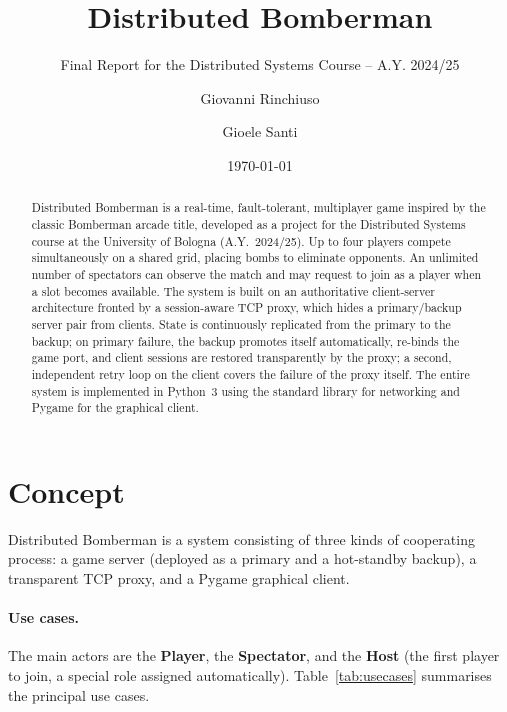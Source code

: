 \documentclass{scrartcl}
\title{\LARGE Distributed Bomberman}
\subtitle{Final Report for the Distributed Systems Course -- A.Y. 2024/25}
\author{
    Giovanni Rinchiuso \\ \emailaddr{giovanni.rinchiuso@studio.unibo.it}
    \and
    Gioele Santi \\ \emailaddr{gioele.santi2@studio.unibo.it}
}
\date{\today}
\begin{document}
\maketitle

\begin{abstract}
Distributed Bomberman is a real-time, fault-tolerant, multiplayer game inspired by the classic Bomberman arcade title, developed as a project for the Distributed Systems course at the University of Bologna (A.Y.\ 2024/25). Up to four players compete simultaneously on a shared grid, placing bombs to eliminate opponents. An unlimited number of spectators can observe the match and may request to join as a player when a slot becomes available. The system is built on an authoritative client-server architecture fronted by a session-aware TCP proxy, which hides a primary/backup server pair from clients. State is continuously replicated from the primary to the backup; on primary failure, the backup promotes itself automatically, re-binds the game port, and client sessions are restored transparently by the proxy; a second, independent retry loop on the client covers the failure of the proxy itself. The entire system is implemented in Python~3 using the standard library for networking and Pygame for the graphical client.
\end{abstract}

\newpage
\tableofcontents
\newpage

\section{Concept}\label{concept}

Distributed Bomberman is a system consisting of three kinds of cooperating process: a game server (deployed as a primary and a hot-standby backup), a transparent TCP proxy, and a Pygame graphical client.

\paragraph{Use cases.}
The main actors are the \textbf{Player}, the \textbf{Spectator}, and the \textbf{Host} (the first player to join, a special role assigned automatically).
Table~\ref{tab:usecases} summarises the principal use cases.
\end{document}
